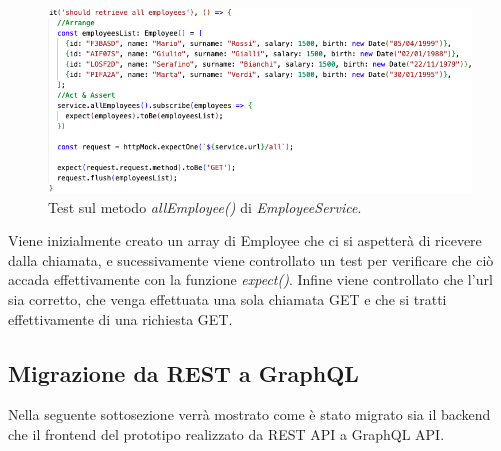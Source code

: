\begin{figure}[!ht]
\centering
\includegraphics[width=0.8\linewidth]{immagini/allEmployeeTest.png}
\caption{Test sul metodo \textit{allEmployee()} di \textit{EmployeeService}.}
\label{get-all-test}
\end{figure}
\FloatBarrier
Viene inizialmente creato un array di Employee che ci si aspetterà di ricevere dalla chiamata, e sucessivamente viene controllato un test per verificare che ciò accada effettivamente con la funzione \textit{expect()}. Infine viene controllato che l'url sia corretto, che venga effettuata una sola chiamata GET e che si tratti effettivamente di una richiesta GET.

\subsection{Migrazione da REST a GraphQL}
Nella seguente sottosezione verrà mostrato come è stato migrato sia il backend che il frontend del prototipo realizzato da REST API a GraphQL API.
